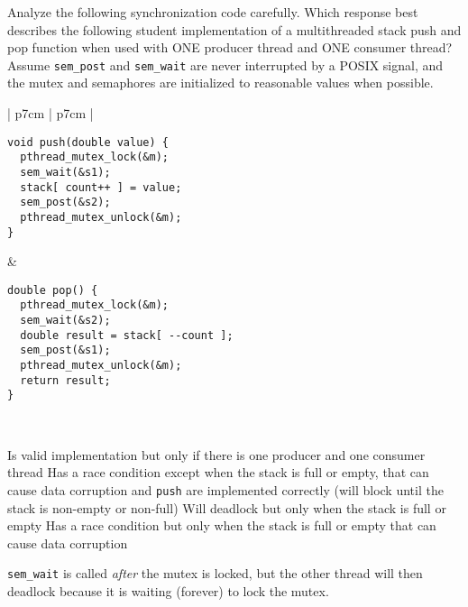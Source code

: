 
\variant
Analyze the following synchronization code carefully. Which response best describes the following student implementation of a multithreaded stack push and pop function when used with ONE producer thread and ONE consumer thread? Assume {\tt sem_post} and {\tt sem_wait} are never interrupted by a POSIX signal, and the mutex and semaphores are initialized to reasonable values when possible.
\\
\begin{tabular}{ | p{7cm} | p{7cm} | }
\hline \begin{verbatim}void push(double value) {
  pthread_mutex_lock(&m);
  sem_wait(&s1);
  stack[ count++ ] = value;
  sem_post(&s2);
  pthread_mutex_unlock(&m);
} \end{verbatim} & \begin{verbatim}
double pop() {
  pthread_mutex_lock(&m);
  sem_wait(&s2);
  double result = stack[ --count ];
  sem_post(&s1);
  pthread_mutex_unlock(&m);
  return result;
}\end{verbatim} \\ \hline
\end{tabular}
\begin{answers}
\answer Is valid implementation but only if there is one producer and one consumer thread
\answer Has a race condition except when the stack is full or empty, that can cause data corruption
 and {\tt push} are implemented correctly (will block until the stack is non-empty or non-full)
\correctanswer Will deadlock but only when the stack is full or empty
\answer Has a race condition but only when the stack is full or empty that can cause data corruption
\end{answers}
\begin{solution}
{\tt sem_wait} is called {\em after} the mutex is locked, but the  other thread will then deadlock because it is waiting (forever) to lock the mutex.
\end{solution}






